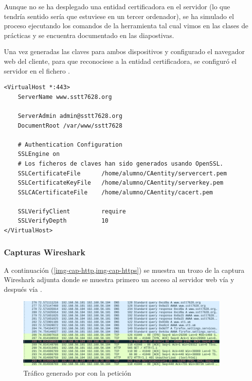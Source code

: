 Aunque no se ha desplegado una entidad certificadora en el servidor (lo que tendría sentido sería que estuviese en un tercer ordenador), se ha simulado el proceso ejecutando los comandos de la herramienta  tal cual vimos en las clases de prácticas y se encuentra documentado en las diapostivas.


Una vez generadas las claves para ambos dispositivos y configurado el navegador web del cliente,  para que reconociese a la entidad certificadora, se configuró el servidor {\HTTPs} en el fichero .

\begin{lstlisting}[title=Segunda parte del fichero \file{/etc/apache2/sites-available/sstt7628.conf}]
<VirtualHost *:443>
	ServerName www.sstt7628.org

	ServerAdmin admin@sstt7628.org
	DocumentRoot /var/www/sstt7628

	# Authentication Configuration
	SSLEngine on
	# Los ficheros de claves han sido generados usando OpenSSL.
	SSLCertificateFile		/home/alumno/CAentity/servercert.pem
	SSLCertificateKeyFile	/home/alumno/CAentity/serverkey.pem
	SSLCACertificateFile	/home/alumno/CAentity/cacert.pem

	SSLVerifyClient			require
	SSLVerifyDepth			10
</VirtualHost>
\end{lstlisting}

\subsubsection{Capturas Wireshark}
A continuación (\cref{img-cap-http,img-cap-https}) se muestra un trozo de la captura Wireshark adjunta donde se muestra primero un acceso al servidor web vía {\HTTP} y después vía {\HTTPs}.

\begin{figure}[h]
    \centering
    \includegraphics[width=0.95\textwidth]{tests/capture-http.png}
    \caption{Tráfico generado por  con la petición {\HTTP}}
    \label{img-cap-http}
\end{figure}

